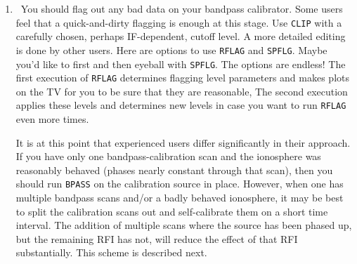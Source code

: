 \begin{enumerate}
\item\ You should flag out any bad data on your bandpass calibrator.
  Some users feel that a quick-and-dirty flagging is enough at this
  stage.  Use {\tt CLIP} with a carefully chosen, perhaps
  IF-dependent, cutoff level.  A more detailed editing is done by
  other users.  Here are options to use {\tt RFLAG} and {\tt SPFLG}.
  Maybe you'd like to {\tt {}} first and then eyeball with
  {\tt SPFLG}\@.  The options are endless!  The first execution of
  {\tt RFLAG} determines flagging level parameters and makes plots on
  the TV for you to be sure that they are reasonable,  The second
  execution applies these levels and determines new levels in case you
  want to run {\tt RFLAG} even more
  times.\label{it:beginbpass}

It is at this point that experienced users differ significantly in
their approach.  If you have only one bandpass-calibration scan and the
ionosphere was reasonably behaved (phases nearly constant through that
scan), then you should run {\tt BPASS} on the calibration source in
place.  However, when one has multiple bandpass scans and/or a badly
behaved ionosphere, it may be best to split the calibration scans out
and self-calibrate them on a short time interval.  The addition of
multiple scans where the source has been phased up, but the remaining
RFI has not, will reduce the effect of that RFI substantially.  This
scheme is described next.


\end{enumerate}
